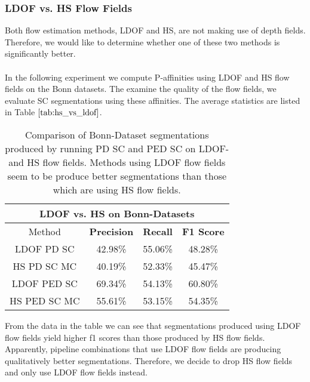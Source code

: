 \subsubsection{LDOF vs. HS Flow Fields}
Both flow estimation methods, LDOF and HS, are not making use of depth fields. Therefore, we would like to determine whether one of these two methods is significantly better. \\ \\
In the following experiment we compute P-affinities using LDOF and HS flow fields on the Bonn datasets. The examine the quality of the flow fields, we evaluate SC segmentations using these affinities. The average statistics are listed in Table $\ref{tab:hs_vs_ldof}$.
\begin{table}[H]
\centering
\begin{tabular}{|c|c|c|c|}
\hline
\multicolumn{4}{|c|}{LDOF vs. HS on Bonn-Datasets}                        \\ \hline
Method & \textbf{Precision} & \textbf{Recall} & \textbf{F1 Score} \\ \hline
LDOF PD SC & 42.98\%   & 55.06\%     & 48.28\%  \\ \hline
HS PD SC MC & 40.19\%   & 52.33\%     & 45.47\%  \\ \hline
LDOF PED SC & 69.34\%   & 54.13\%     & 60.80\%  \\ \hline
HS PED SC MC & 55.61\%   & 53.15\%     & 54.35\%  \\ \hline             
\end{tabular}
\caption[LDOF vs. HS Flow Fields]{Comparison of Bonn-Dataset segmentations produced by running PD SC and PED SC on LDOF- and HS flow fields. Methods using LDOF flow fields seem to be produce better segmentations than those which are using HS flow fields.}
\label{tab:hs_vs_ldof}
\end{table}
From the data in the table we can see that segmentations produced using LDOF flow fields yield higher f1 scores than those produced by HS flow fields. Apparently, pipeline combinations that use LDOF flow fields are producing qualitatively better segmentations. Therefore, we decide to drop HS flow fields and only use LDOF flow fields instead.

